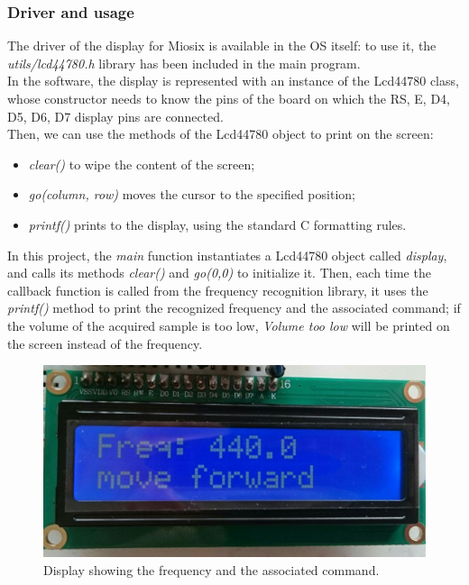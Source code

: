 \subsubsection{Driver and usage}
The driver of the display for Miosix is available in the OS itself: to use it, the \textit{utils/lcd44780.h} library has been included in the main program. \\
In the software, the display is represented with an instance of the Lcd44780 class, whose constructor needs to know the pins of the board on which the RS, E, D4, D5, D6, D7 display pins are connected. \\
Then, we can use the methods of the Lcd44780 object to print on the screen:
 \begin{itemize}
 	\item \textit{clear()} to wipe the content of the screen;
 	\item \textit{go(column, row)} moves the cursor to the specified position;
 	\item \textit{printf()} prints to the display, using the standard C formatting rules.
 \end{itemize}

In this project, the \textit{main} function instantiates a Lcd44780 object called \textit{display}, and calls its methods \textit{clear()} and \textit{go(0,0)} to initialize it.
Then, each time the callback function is called from the frequency recognition library, it uses the \textit{printf()} method to print the recognized frequency and the associated command; if the volume of the acquired sample is too low, \textit{Volume too low} will be printed on the screen instead of the frequency.

\begin{figure}[H]
	\centering
	\includegraphics[width=\textwidth]
	{files/images/display_on.jpg}
	\caption{Display showing the frequency and the associated command.}
\end{figure}